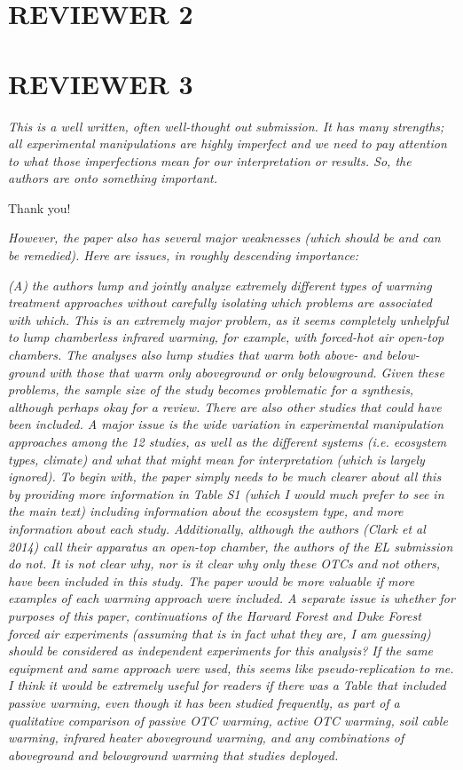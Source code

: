 \documentclass[11pt,a4paper]{letter}
\begin{document}
\begin{letter}{}
\section {REVIEWER 2}

\section {REVIEWER 3}

\emph{This is a well written, often well-thought out submission. It has many strengths; all experimental manipulations are highly imperfect and we need to pay attention to what those imperfections mean for our interpretation or results. So, the authors are onto something important.}

Thank you!

\emph{However, the paper also has several major weaknesses (which should be and can be remedied). Here are issues, in roughly descending importance:}

\emph{(A) the authors lump and jointly analyze extremely different types of warming treatment approaches without carefully isolating which problems are associated with which. This is an extremely major problem, as it seems completely unhelpful to lump chamberless infrared warming, for example, with forced-hot air open-top chambers. The analyses also lump studies that warm both above- and below-ground with those that warm only aboveground or only belowground. Given these problems, the sample size of the study becomes problematic for a synthesis, although perhaps okay for a review. There are also other studies that could have been included. A major issue is the wide variation in experimental manipulation approaches among the 12 studies, as well as the different systems (i.e. ecosystem types, climate) and what that might mean for interpretation (which is largely ignored). To begin with, the paper simply needs to be much clearer about all this by providing more information in Table S1 (which I would much prefer to see in the main text) including information about the ecosystem type, and more information about each study. Additionally, although the authors (Clark et al 2014) call their apparatus an open-top chamber, the authors of the EL submission do not. It is not clear why, nor is it clear why only these OTCs and not others, have been included in this study. The paper would be more valuable if more examples of each warming approach were included. A separate issue is whether for purposes of this paper, continuations of the Harvard Forest and Duke Forest forced air experiments (assuming that is in fact what they are, I am guessing) should be considered as independent experiments for this analysis? If the same equipment and same approach were used, this seems like pseudo-replication to me. I think it would be extremely useful for readers if there was a Table that included passive warming, even though it has been studied frequently, as part of a qualitative comparison of passive OTC warming, active OTC warming, soil cable warming, infrared heater aboveground warming, and any combinations of aboveground and belowground warming that studies deployed.}


\end{letter}
\end{document}

